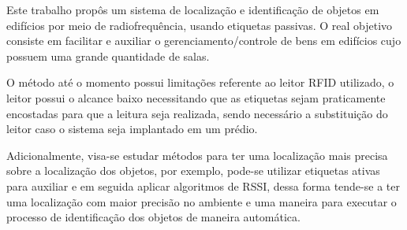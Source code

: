 
\label{chapter:consideracoes}

Este trabalho propôs um sistema de localização e identificação de objetos em edifícios por meio de
radiofrequência, usando etiquetas passivas. O real objetivo consiste em facilitar e auxiliar o gerenciamento/controle de
bens em edifícios cujo possuem uma grande quantidade de salas.
\par
O método até o momento possui limitações referente ao leitor RFID utilizado, o leitor possui o alcance baixo necessitando que as etiquetas sejam praticamente encostadas para que a leitura seja realizada, sendo necessário a substituição do leitor caso o sistema seja implantado em um prédio.
\par

Adicionalmente, visa-se estudar métodos para ter uma localização mais precisa sobre a localização dos objetos, por exemplo, pode-se utilizar etiquetas ativas para auxiliar e em seguida aplicar algoritmos de RSSI, dessa forma tende-se a ter uma localização com maior precisão no ambiente e uma maneira para executar o processo de identificação dos objetos de maneira automática. 



